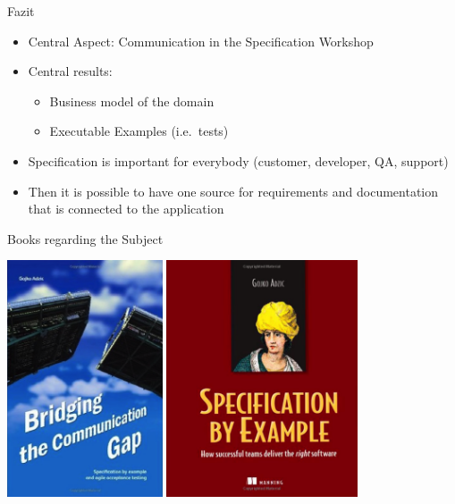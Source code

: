 \begin{frame}{Fazit}

\begin{itemize}
	\item Central Aspect: Communication in the Specification Workshop
	\item Central results:
	\begin{itemize}
		\item Business model of the domain
		\item Executable Examples (i.e.~tests)
	\end{itemize}
	\item Specification is important for everybody (customer, developer, QA, support)
	\item Then it is possible to have one source for requirements and documentation that is connected to the application
\end{itemize}

\end{frame}

\begin{frame}{Books regarding the Subject}

\begin{center}
\includegraphics[height=7cm]{CommunicationGap.png}
\hfill
\includegraphics[height=7cm]{SpecificationByExample.png}
\end{center}

\end{frame}

